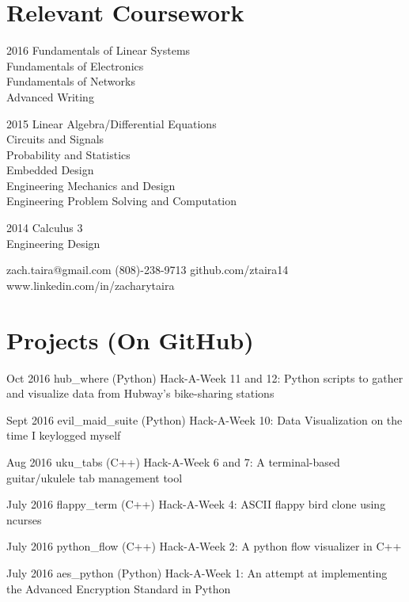 \documentclass{tccv}
\begin{document}
\section{Relevant Coursework}
\begin{factlist}
\item{2016}
    {Fundamentals of Linear Systems\\
    Fundamentals of Electronics\\
    Fundamentals of Networks\\
    Advanced Writing}
\item{2015}
    {Linear Algebra/Differential Equations\\
    Circuits and Signals\\
    Probability and Statistics\\
    Embedded Design\\
    Engineering Mechanics and Design\\
    Engineering Problem Solving and Computation}
\item{2014}
    {Calculus 3\\
    Engineering Design}
\end{factlist}

\personal
    {zach.taira@gmail.com}
    {(808)-238-9713}
    {github.com/ztaira14}
    {www.linkedin.com/in/zacharytaira}

\section{Projects (On GitHub)}

\begin{yearlist}

\item{Oct 2016}
    {hub\_where (Python)}
    {Hack-A-Week 11 and 12: Python scripts to gather and visualize data
from Hubway's bike-sharing stations}

\item{Sept 2016}
    {evil\_maid\_suite (Python)}
    {Hack-A-Week 10: Data Visualization on the time I keylogged myself}

\item{Aug 2016}
    {uku\_tabs (C++)}
    {Hack-A-Week 6 and 7: A terminal-based guitar/ukulele tab management tool}

\item{July 2016}
    {flappy\_term (C++)}
    {Hack-A-Week 4: ASCII flappy bird clone using ncurses}

\item{July 2016}
    {python\_flow (C++)}
    {Hack-A-Week 2: A python flow visualizer in C++}

\item{July 2016}
    {aes\_python (Python)}
    {Hack-A-Week 1: An attempt at implementing the Advanced Encryption
    Standard in Python}

\end{yearlist}
\end{document}
